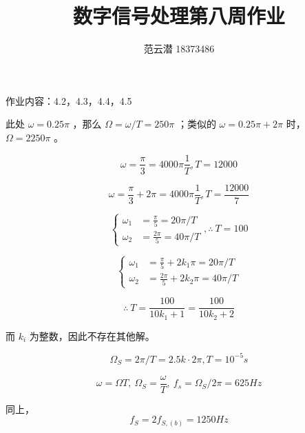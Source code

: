 \documentclass[lang=cn,11pt,a4paper,cite=authoryear,twocolumn]{elegantpaper}
\title{数字信号处理\quad 第八周作业}
\author{范云潜 18373486}
\institute{微电子学院 184111 班}
\date{\zhtoday}
\begin{document}
\maketitle

作业内容：4.2，4.3，4.4，4.5



此处 \(\omega = 0.25 \pi \) ，那么 \(\Omega = \omega / T = 250 \pi\) ；类似的 \(\omega = 0.25 \pi + 2 \pi \) 时， \(\Omega = 2250 \pi \) 。



\[\omega = \frac{\pi}{3} = 4000\pi \frac{1}{T} , T = 12000\]


\[\omega = \frac{\pi}{3} + 2 \pi = 4000\pi \frac{1}{T} , T = \frac{12000}{7}\]



\[\left\{\begin{aligned}
    \omega_1 &= \frac{\pi}{5} = 20 \pi / T \\
    \omega_2 &= \frac{2 \pi }{5} = 40 \pi / T
\end{aligned}\right., \therefore\: T = 100\]


\[\left\{\begin{aligned}
    \omega_1 &= \frac{\pi}{5} + 2k_1 \pi = 20 \pi / T \\
    \omega_2 &= \frac{2 \pi }{5} + 2 k_2 \pi = 40 \pi / T
\end{aligned}\right. \]

\[\therefore\: T = \frac{100}{10k_1 + 1} = \frac{100}{10k_2 + 2}\]

而 \(k_i\) 为整数，因此不存在其他解。



\[\Omega_S = 2\pi / T = 2.5 k \cdot 2 \pi, T = 10^{-5} s\]


\[\omega = \Omega T,\: \Omega_S = \frac{\omega}{T}, \: f_s = \Omega_S/2\pi = 625Hz\]


同上，\[f_S = 2 f_{S,(b)} = 1250 Hz\]






\end{document}
